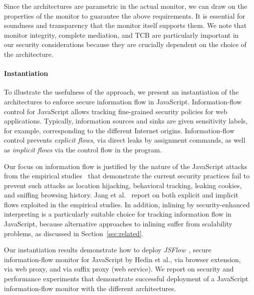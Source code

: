 \documentclass{llncs}
\begin{document}
Since the architectures are parametric in the actual monitor, we can
draw on the properties of the monitor to guarantee the
above requirements.
It is essential for soundness and transparency that the monitor itself supports them. 
We note that monitor integrity,
complete mediation, and TCB are particularly important in our security
considerations because they are crucially dependent on the choice of
the architecture.

\paragraph{Instantiation}
To illustrate the usefulness of the approach, we present an
instantiation of the architectures to enforce secure information flow
in JavaScript. Information-flow control for JavaScript allows tracking
fine-grained security policies for web applications. Typically,
information sources  and sinks are given sensitivity labels, for
example, corresponding to the different Internet origins.
Information-flow control prevents \emph{explicit flows}, via
direct leaks by assignment commands, as well as
\emph{implicit flows} via the control flow in the program.

Our focus on information flow is justified by
the nature of the JavaScript attacks from the empirical
studies~\cite{Jang+:CCS10,Nikiforakis+:CCS12} that demonstrate the current security
practices fail to  prevent such attacks as
location
hijacking, behavioral tracking, leaking cookies, and sniffing browsing
history. Jang et al.~\cite{Jang+:CCS10} report on both explicit and
implicit flows exploited in the empirical studies.
%
In addition, inlining by security-enhanced interpreting is a
particularly suitable choice for tracking information flow in
JavaScript, because alternative approaches to inlining suffer from
scalability problems, as discussed in Section~\ref{sec:related}. 

Our instantiation results demonstrate how to deploy
\emph{JSFlow}~\cite{Hedin:Sabelfeld:CSF12,JSFlow}, secure information-flow
monitor for JavaScript by Hedin et al., via
browser extension, via web proxy, and via suffix proxy (web service).
%
We report on security and performance experiments that demonstrate successful deployment of a JavaScript
information-flow monitor with the different architectures.


\end{document}
